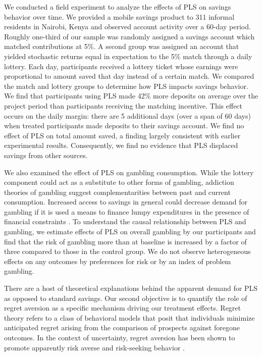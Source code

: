 \documentclass[12pt, titlepage]{article}
\begin{document}
	We conducted a field experiment to analyze the effects of PLS on savings behavior over time. We provided a mobile savings product to 311 informal residents in Nairobi, Kenya and observed account activity over a 60-day period. Roughly one-third of our sample was randomly assigned a savings account which matched contributions at 5\%. A second group was assigned an account that yielded stochastic returns equal in expectation to the 5\% match through a daily lottery. Each day, participants received a lottery ticket whose earnings were proportional to amount saved that day instead of a certain match. We compared the match and lottery groups to determine how PLS impacts savings behavior. We find that participants using PLS made 42\% more deposits on average over the project period than participants receiving the matching incentive. This effect occurs on the daily margin: there are 5 additional days (over a span of 60 days) when treated participants made deposits to their savings account. We find no effect of PLS on total amount saved, a finding largely consistent with earlier experimental results. Consequently, we find no evidence that PLS displaced savings from other sources. 

	We also examined the effect of PLS on gambling consumption. While the lottery component could act as a substitute to other forms of gambling, addiction theories of gambling \parencite{becker_theory_1988} suggest complementarities between past and current consumption. Increased access to savings in general could decrease demand for gambling if it is used a means to finance lumpy expenditures in the presence of financial constraints \parencite{herskowitz_gambling_2016}. To understand the causal relationship between PLS and gambling, we estimate effects of PLS on overall gambling by our participants and find that the risk of gambling more than at baseline is increased by a factor of three compared to those in the control group. We do not observe heterogeneous effects on any outcomes by preferences for risk or by an index of problem gambling.

	There are a host of theoretical explanations behind the apparent demand for PLS as opposed to standard savings. Our second objective is to quantify the role of regret aversion \parencite{bell_risk_1983,loomes_regret_1982} as a specific mechanism driving our treatment effects. Regret theory refers to a class of behavioral models that posit that individuals minimize anticipated regret arising from the comparison of prospects against foregone outcomes. In the context of uncertainty, regret aversion has been shown to promote apparently risk averse and risk-seeking behavior  \parencite{zeelenberg_consequences_1996}. 
\end{document}
